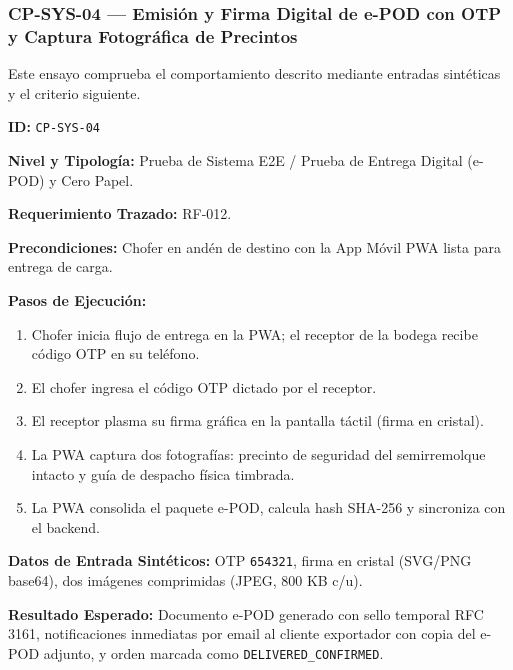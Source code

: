 \subsubsection*{CP-SYS-04 — Emisión y Firma Digital de e-POD con OTP y Captura Fotográfica de Precintos}\label{sec:9-cp-sys-04}
Este ensayo comprueba el comportamiento descrito mediante entradas sintéticas y el criterio siguiente.

\par\noindent\textbf{ID:} \texttt{C\allowbreak{}P\allowbreak{}-\allowbreak{}S\allowbreak{}Y\allowbreak{}S\allowbreak{}-\allowbreak{}0\allowbreak{}4\allowbreak{}}\par
\par\noindent\textbf{Nivel y Tipología:} Prueba de Sistema E2E / Prueba de Entrega Digital (e-POD) y Cero Papel.\par
\par\noindent\textbf{Requerimiento Trazado:} RF-012.\par
\par\noindent\textbf{Precondiciones:} Chofer en andén de destino con la App Móvil PWA lista para entrega de carga.\par
\par\noindent\textbf{Pasos de Ejecución:} \par
\begin{enumerate}
\item Chofer inicia flujo de entrega en la PWA; el receptor de la bodega recibe código OTP en su teléfono.
\item El chofer ingresa el código OTP dictado por el receptor.
\item El receptor plasma su firma gráfica en la pantalla táctil (firma en cristal).
\item La PWA captura dos fotografías: precinto de seguridad del semirremolque intacto y guía de despacho física timbrada.
\item La PWA consolida el paquete e-POD, calcula hash SHA-256 y sincroniza con el backend.
\end{enumerate}
\par\noindent\textbf{Datos de Entrada Sintéticos:} OTP \texttt{6\allowbreak{}5\allowbreak{}4\allowbreak{}3\allowbreak{}2\allowbreak{}1\allowbreak{}}, firma en cristal (SVG/PNG base64), dos imágenes comprimidas (JPEG, 800 KB c/u).\par
\par\noindent\textbf{Resultado Esperado:} Documento e-POD generado con sello temporal RFC 3161, notificaciones inmediatas por email al cliente exportador con copia del e-POD adjunto, y orden marcada como \texttt{D\allowbreak{}E\allowbreak{}L\allowbreak{}I\allowbreak{}V\allowbreak{}E\allowbreak{}R\allowbreak{}E\allowbreak{}D\allowbreak{}\_\allowbreak{}C\allowbreak{}O\allowbreak{}N\allowbreak{}F\allowbreak{}I\allowbreak{}R\allowbreak{}M\allowbreak{}E\allowbreak{}D\allowbreak{}}.\par

